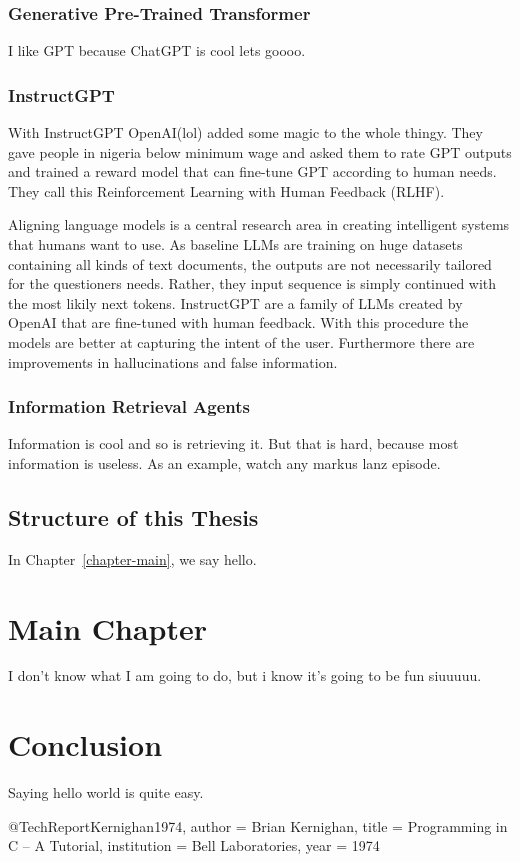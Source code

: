 \documentclass[english, version-2022-01]{uzl-thesis}
\begin{document}
\subsection{Generative Pre-Trained Transformer}
I like GPT because ChatGPT is cool lets goooo.

\subsection{InstructGPT}
With InstructGPT OpenAI(lol) added some magic to the whole thingy. They gave people in nigeria below minimum wage and asked them to rate GPT outputs and trained a reward model that can fine-tune GPT according to human needs. They call this Reinforcement Learning with Human Feedback (RLHF).

Aligning language models is a central research area in creating intelligent systems that humans want to use. As baseline LLMs are training on huge datasets containing all kinds of text documents, the outputs are not necessarily tailored for the questioners needs.
Rather, they input sequence is simply continued with the most likily next tokens. InstructGPT are a family of LLMs created by OpenAI that are fine-tuned with human feedback. With this procedure the models are better at capturing the intent of the user. Furthermore there are improvements in hallucinations and false information.
\subsection{Information Retrieval Agents}
Information is cool and so is retrieving it. But that is hard, because most information is useless. As an example, watch any markus lanz episode.
\section{Structure of this Thesis}


In Chapter~\vref{chapter-main}, we say hello.
\chapter{Main Chapter}
\label{chapter-main}
I don't know what I am going to do, but i know it's going to be fun siuuuuu.
\chapter{Conclusion}
Saying hello world is quite easy.
\begin{bibtex-entries}
@TechReport{Kernighan1974,
	author = {Brian Kernighan},
	title = {Programming in C – A Tutorial},
	institution = {Bell Laboratories},
	year = {1974}
}
\end{bibtex-entries}
\end{document}
